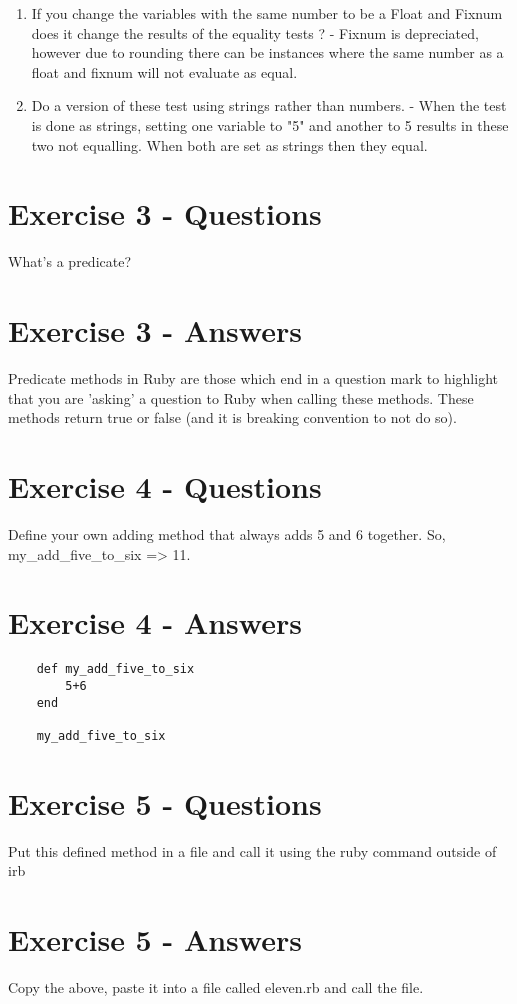 \documentclass{scrreprt}
\begin{document}
\begin{enumerate}
\begin{verbatim}
		\end{verbatim}
		\item If you change the variables with the same number to be a Float and Fixnum does it change the results of the equality tests ? - Fixnum is depreciated, however due to rounding there can be instances where the same number as a float and fixnum will not evaluate as equal.

		\item Do a version of these test using strings rather than numbers. -  When the test is done as strings, setting one variable to "5" and another to 5 results in these two not equalling. When both are set as strings then they equal.
	\end{enumerate}
	
		
	\section{Exercise 3 - Questions}
	What's a predicate?

	\section{Exercise 3 - Answers}
	Predicate methods in Ruby are those which end in a question mark to highlight that you are 'asking' a question to Ruby when calling these methods. These methods return true or false (and it is breaking convention to not do so).
		
	\section{Exercise 4 - Questions}
Define your own adding method that always adds 5 and 6 together.
So, my\_add\_five\_to\_six => 11.

	\section{Exercise 4 - Answers}
\begin{verbatim}
	def my_add_five_to_six
		5+6
	end 
	
	my_add_five_to_six
\end{verbatim}

		
\section{Exercise 5 - Questions}
Put this defined method in a file and call it using the ruby command outside of irb

		
\section{Exercise 5 - Answers}
Copy the above, paste it into a file called eleven.rb and call the file.
\end{document}
